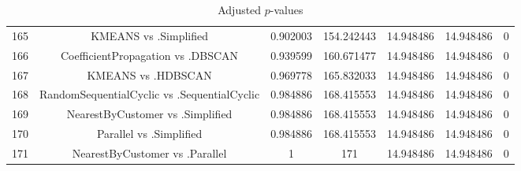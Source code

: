 \documentclass[a4paper,10pt]{article}
\begin{document}
\begin{landscape}
\begin{table}[!htp]
\begin{tabular}{ccccccc}
165&KMEANS vs .Simplified&0.902003&154.242443&14.948486&14.948486&0\\
166&CoefficientPropagation vs .DBSCAN&0.939599&160.671477&14.948486&14.948486&0\\
167&KMEANS vs .HDBSCAN&0.969778&165.832033&14.948486&14.948486&0\\
168&RandomSequentialCyclic vs .SequentialCyclic&0.984886&168.415553&14.948486&14.948486&0\\
169&NearestByCustomer vs .Simplified&0.984886&168.415553&14.948486&14.948486&0\\
170&Parallel vs .Simplified&0.984886&168.415553&14.948486&14.948486&0\\
171&NearestByCustomer vs .Parallel&1&171&14.948486&14.948486&0\\
\hline
\end{tabular}
\caption{Adjusted $p$-values}
\end{table}

\end{landscape}
\end{document}
